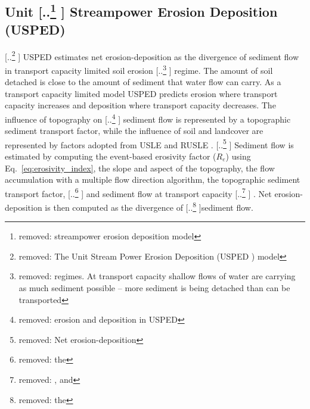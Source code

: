 \documentclass[gmd, manuscript]{copernicus}
\providecommand{\DIFadd}[1]{{\protect\color{blue} \sf #1}} %
\providecommand{\DIFdel}[1]{{\protect\color{red} [..\footnote{removed: #1} ]}} %
\providecommand{\DIFaddbegin}{} %
\providecommand{\DIFaddend}{} %
\providecommand{\DIFdelbegin}{} %
\providecommand{\DIFdelend}{} %
\begin{document}

\subsection{Unit \DIFdelbegin \DIFdel{streampower erosion deposition model}\DIFdelend \DIFaddbegin \DIFadd{Streampower Erosion Deposition (USPED)}\DIFaddend } \label{usped_model}
\DIFdelbegin \DIFdel{The Unit Stream Power Erosion Deposition (USPED ) model 
}\DIFdelend \DIFaddbegin \DIFadd{USPED }\DIFaddend estimates net erosion-deposition as the divergence of sediment flow
in transport capacity limited soil erosion \DIFdelbegin \DIFdel{regimes.
At transport capacity 
shallow flows of water are carrying as much sediment possible 
-- more sediment is being detached than can be transported}\DIFdelend \DIFaddbegin \DIFadd{regime.
The amount of soil detached is 
close to the amount of sediment that water flow can carry}\DIFaddend .
As a transport capacity limited model
USPED predicts erosion where transport capacity increases
and deposition where transport capacity decreases. 
The influence of topography on \DIFdelbegin \DIFdel{erosion and deposition in USPED 
}\DIFdelend \DIFaddbegin \DIFadd{sediment flow  
}\DIFaddend is represented by a topographic sediment transport factor,
while the influence of soil and landcover are represented by 
factors adopted from USLE and RUSLE
\citep{Mitasova1996}.
%
\DIFdelbegin \DIFdel{Net erosion-deposition }\DIFdelend \DIFaddbegin \DIFadd{Sediment flow }\DIFaddend is estimated by computing
the event-based erosivity factor ($R_e$) 
using Eq.~\ref{eq:erosivity_index},
the slope and aspect of the topography,
the flow accumulation with a multiple flow direction algorithm,
the topographic sediment transport factor,
\DIFdelbegin \DIFdel{the }\DIFdelend \DIFaddbegin \DIFadd{and }\DIFaddend sediment flow at transport capacity\DIFdelbegin \DIFdel{,
and }\DIFdelend \DIFaddbegin \DIFadd{.
Net erosion-deposition is then computed as }\DIFaddend the divergence of \DIFdelbegin \DIFdel{the }\DIFdelend sediment flow. 
\end{document}
